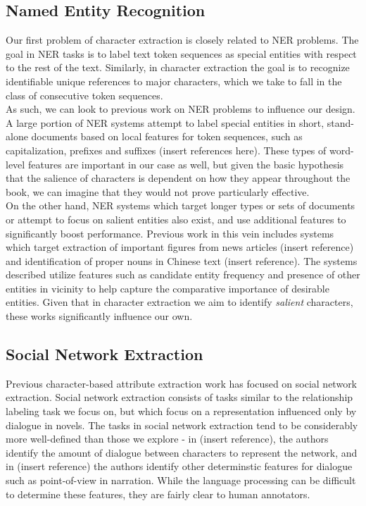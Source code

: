 \documentclass[12pt]{article}
\begin{document}
\subsection{Named Entity Recognition}

    Our first problem of character extraction is closely related to NER problems. The goal in NER tasks
    is to label text token sequences as special entities with respect to the rest of the text. Similarly, in 
    character extraction the goal is to recognize identifiable unique references to major characters, which
    we take to fall in the class of consecutive token sequences. \\

    As such, we can look to previous work on NER problems to influence our design. A large portion of NER systems
    attempt to label special entities in short, stand-alone documents based on local features for token
    sequences, such as capitalization, prefixes and suffixes (insert references here). These types of word-level
    features are important in our case as well, but given the basic hypothesis that the salience of characters 
    is dependent on how they appear throughout the book, we can imagine that they would not prove particularly 
    effective. \\

    On the other hand, NER systems which target longer types or sets of documents or attempt to focus on
    salient entities also exist, and use additional features to significantly boost performance. 
    Previous work in this vein includes systems which target extraction of important figures 
    from news articles (insert reference) and identification of proper nouns in Chinese text (insert reference).
    The systems described utilize features such as candidate entity frequency and presence of other
    entities in vicinity to help capture the comparative importance of desirable entities. Given that in 
    character extraction we aim to identify \emph{salient} characters, these works significantly influence
    our own. \\

\subsection{Social Network Extraction}

    Previous character-based attribute extraction work has focused on social network extraction.
    Social network extraction consists of tasks similar to the relationship labeling task we focus on, but which 
    focus on a representation influenced only by dialogue in novels. The tasks in social network
    extraction tend to be considerably more well-defined than those we explore - in (insert reference),
    the authors identify the amount of dialogue between characters to represent the network, and in
    (insert reference) the authors identify other determinstic features for dialogue such as
    point-of-view in narration. While the language processing can be difficult to determine these
    features, they are fairly clear to human annotators. \\
\end{document}
